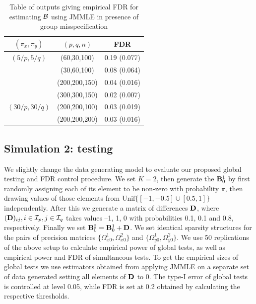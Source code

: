 \begin{scriptsize}
\begin{table}[t]
\centering
    \begin{tabular}{ccc}
    \hline
    $(\pi_x, \pi_y)$ & $(p,q,n)$   & FDR          \\\hline
    $(5/p, 5/q)$   & (60,30,100)   & 0.19 (0.077) \\
    ~              & (30,60,100)   & 0.08 (0.064) \\
    ~              & (200,200,150) & 0.04 (0.016) \\
    ~              & (300,300,150) & 0.02 (0.007) \\\hline
    $(30/p, 30/q)$ & (200,200,100) & 0.03 (0.019) \\
    ~              & (200,200,200) & 0.03 (0.016) \\\hline
    \end{tabular}
    \caption{Table of outputs giving empirical FDR for estimating ${\cal{B}}$ using JMMLE in presence of group misspecification}
    \label{table:simtable22}
\end{table}
\end{scriptsize}

\subsection{Simulation 2: testing}
\label{sec:eval-testing}
We slightly change the data generating model to evaluate our proposed global testing and FDR control procedure. We set $K=2$, then generate the ${\mathbf{B}}_0^1$ by first randomly assigning each of its element to be non-zero with probability $\pi$, then drawing values of those elements from $\text{Unif}\{ [ -1, -0.5] \cup [0.5,1]\}$ independently. After this we generate a matrix of differences ${\mathbf{D}}$, where $({\mathbf{D}})_{ij}, i \in {\cal{I}}_p, j \in {\cal{I}}_q$ takes values --1, 1, 0 with probabilities 0.1, 0.1 and 0.8, respectively. Finally we set ${\mathbf{B}}_0^2 = {\mathbf{B}}_0^1 + {\mathbf{D}}$. We set identical sparsity structures for the pairs of precision matrices $\{ \Omega_{x0}^1, \Omega_{x0}^2 \}$ and $\{ \Omega_{y0}^1, \Omega_{y0}^2 \}$. We use 50 replications of the above setup to calculate empirical power of global tests, as well as empirical power and FDR of simultaneous tests. To get the empirical sizes of global tests we use estimators obtained from applying JMMLE on a separate set of data generated setting all elements of ${\mathbf{D}}$ to 0. The type-I error of global tests is controlled at level 0.05, while FDR is set at 0.2 obtained by calculating the respective thresholds.

